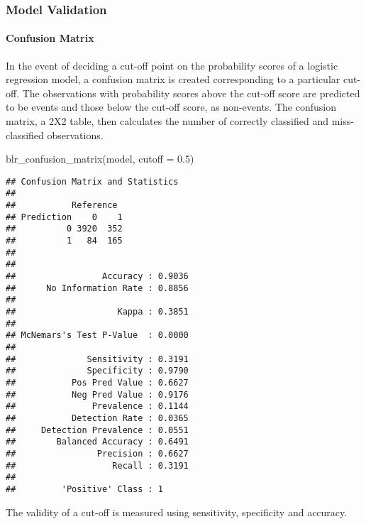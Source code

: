 \documentclass[
]{article}
\newenvironment{Shaded}{\begin{snugshade}}{\end{snugshade}}
\newcommand{\AttributeTok}[1]{\textcolor[rgb]{0.77,0.63,0.00}{#1}}
\newcommand{\FloatTok}[1]{\textcolor[rgb]{0.00,0.00,0.81}{#1}}
\newcommand{\FunctionTok}[1]{\textcolor[rgb]{0.00,0.00,0.00}{#1}}
\newcommand{\NormalTok}[1]{#1}
\begin{document}
\hypertarget{model-validation}{%
\subsubsection{Model Validation}\label{model-validation}}

\hypertarget{confusion-matrix}{%
\paragraph{Confusion Matrix}\label{confusion-matrix}}

In the event of deciding a cut-off point on the probability scores of a
logistic regression model, a confusion matrix is created corresponding
to a particular cut-off. The observations with probability scores above
the cut-off score are predicted to be events and those below the cut-off
score, as non-events. The confusion matrix, a 2X2 table, then calculates
the number of correctly classified and miss-classified observations.

\begin{Shaded}
\begin{Highlighting}[]
\FunctionTok{blr\_confusion\_matrix}\NormalTok{(model, }\AttributeTok{cutoff =} \FloatTok{0.5}\NormalTok{)}
\end{Highlighting}
\end{Shaded}

\begin{verbatim}
## Confusion Matrix and Statistics 
## 
##           Reference
## Prediction    0    1
##          0 3920  352
##          1   84  165
## 
## 
##                 Accuracy : 0.9036 
##      No Information Rate : 0.8856 
## 
##                    Kappa : 0.3851 
## 
## McNemars's Test P-Value  : 0.0000 
## 
##              Sensitivity : 0.3191 
##              Specificity : 0.9790 
##           Pos Pred Value : 0.6627 
##           Neg Pred Value : 0.9176 
##               Prevalence : 0.1144 
##           Detection Rate : 0.0365 
##     Detection Prevalence : 0.0551 
##        Balanced Accuracy : 0.6491 
##                Precision : 0.6627 
##                   Recall : 0.3191 
## 
##         'Positive' Class : 1
\end{verbatim}

The validity of a cut-off is measured using sensitivity, specificity and
accuracy.
\end{document}
